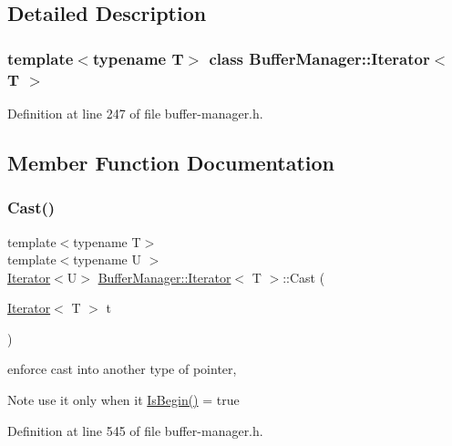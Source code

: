 \subsection{Detailed Description}
\subsubsection*{template$<$typename T$>$\newline
class Buffer\+Manager\+::\+Iterator$<$ T $>$}



Definition at line 247 of file buffer-\/manager.\+h.



\subsection{Member Function Documentation}
\mbox{\label{class_buffer_manager_1_1_iterator_aac3b1b6e41babe5e82814e69e040fd20}} 
\subsubsection{\texorpdfstring{Cast()}{Cast()}}
{\footnotesize\ttfamily template$<$typename T$>$ \\
template$<$typename U $>$ \\
\mbox{\hyperlink{class_buffer_manager_1_1_iterator}{Iterator}}$<$U$>$ \mbox{\hyperlink{class_buffer_manager_1_1_iterator}{Buffer\+Manager\+::\+Iterator}}$<$ T $>$\+::Cast (\begin{DoxyParamCaption}\item[{\mbox{\hyperlink{class_buffer_manager_1_1_iterator}{Iterator}}$<$ T $>$}]{t }\end{DoxyParamCaption})\hspace{0.3cm}{\ttfamily [inline]}}

enforce cast into another type of pointer, \begin{DoxyNote}{Note}
use it only when it {\ttfamily \mbox{\hyperlink{class_buffer_manager_1_1_iterator_a7ce4145bd6263f8003c4c4dee01a9c31}{Is\+Begin()}} = true} 
\end{DoxyNote}


Definition at line 545 of file buffer-\/manager.\+h.

\mbox{\label{class_buffer_manager_1_1_iterator_a2e9a59db2ef1289b16469750e422edd5}} 
